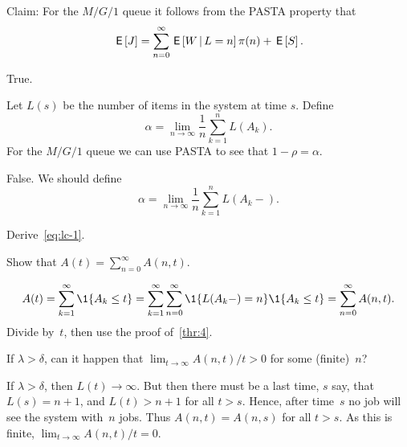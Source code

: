 \documentclass[stochastic-or.tex]{subfiles}
\begin{document}
\begin{truefalse}
Claim: For the $M/G/1$ queue it follows from the PASTA property that
 \begin{equation*}
\,\mathsf{E}\left[J\right] = \sum_{n=0}^\infty \,\mathsf{E}\left[W \,\middle|\, L=n\right] \pi(n) + \,\mathsf{E}\left[S\right].
 \end{equation*}
\begin{solution}
True.
\end{solution}
\end{truefalse}

\begin{truefalse}
Let $L(s)$ be the number of items in the system at time $s$.
Define
\begin{equation*}
\alpha = \lim_{n\to\infty} \frac 1 n \sum_{k=1}^n L(A_k).
\end{equation*}
For the $M/G/1$ queue we can use PASTA to see that $1-\rho = \alpha$.

\begin{solution} False.
We should define
\begin{equation*}
\alpha = \lim_{n\to\infty} \frac 1 n \sum_{k=1}^n L(A_k-).
\end{equation*}
\end{solution}
\end{truefalse}

\begin{exercise}\label{ex:36}
Derive~\cref{eq:lc-1}.
\begin{hint}
 Show that $A(t) =\sum_{n=0}^\infty A(n,t)$.
\end{hint}
\begin{solution}
 \begin{equation*}
A(t) = \sum_{k=1}^\infty \1{A_k \leq t} = \sum_{k=1}^\infty \sum_{n=0}^\infty \1{\L(A_k-) = n} \1{A_k \leq t}  = \sum_{n=0}^\infty A(n,t).
 \end{equation*}
Divide by~$t$, then use the proof of~\cref{thr:4}.
\end{solution}
\end{exercise}

\begin{exercise} \label{ex:38}
If $\lambda>\delta$, can it happen that $ \lim_{t\to\infty} A(n,t)/t > 0$ for some (finite)~$n$?
\begin{solution}
 If $\lambda > \delta$, then $L(t)\to\infty$.
 But then there must be a last time, $s$ say, that $L(s) = n+1$, and $L(t) > n+1$ for all $t>s$.
 Hence, after time~$s$ no job will see the system with~$n$ jobs.
 Thus $A(n,t) = A(n,s)$ for all $t>s$.
As this is  finite, $\lim_{t\to\infty}A(n,t)/t=0$.
\end{solution}
\end{exercise}
\end{document}
